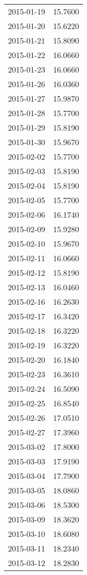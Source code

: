 \begin{tabular}{lr}
2015-01-19 &     15.7600 \\
2015-01-20 &     15.6220 \\
2015-01-21 &     15.8090 \\
2015-01-22 &     16.0660 \\
2015-01-23 &     16.0660 \\
2015-01-26 &     16.0360 \\
2015-01-27 &     15.9870 \\
2015-01-28 &     15.7700 \\
2015-01-29 &     15.8190 \\
2015-01-30 &     15.9670 \\
2015-02-02 &     15.7700 \\
2015-02-03 &     15.8190 \\
2015-02-04 &     15.8190 \\
2015-02-05 &     15.7700 \\
2015-02-06 &     16.1740 \\
2015-02-09 &     15.9280 \\
2015-02-10 &     15.9670 \\
2015-02-11 &     16.0660 \\
2015-02-12 &     15.8190 \\
2015-02-13 &     16.0460 \\
2015-02-16 &     16.2630 \\
2015-02-17 &     16.3420 \\
2015-02-18 &     16.3220 \\
2015-02-19 &     16.3220 \\
2015-02-20 &     16.1840 \\
2015-02-23 &     16.3610 \\
2015-02-24 &     16.5090 \\
2015-02-25 &     16.8540 \\
2015-02-26 &     17.0510 \\
2015-02-27 &     17.3960 \\
2015-03-02 &     17.8000 \\
2015-03-03 &     17.9190 \\
2015-03-04 &     17.7900 \\
2015-03-05 &     18.0860 \\
2015-03-06 &     18.5300 \\
2015-03-09 &     18.3620 \\
2015-03-10 &     18.6080 \\
2015-03-11 &     18.2340 \\
2015-03-12 &     18.2830 \\

\end{tabular}
